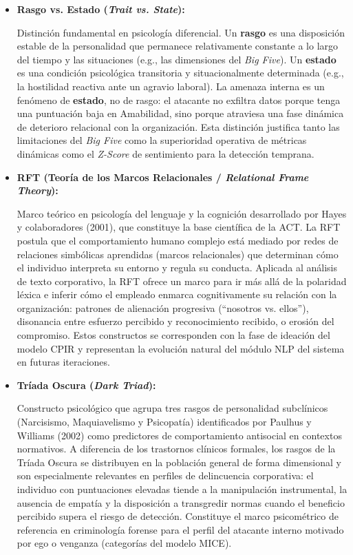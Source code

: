 \documentclass[IB]{TFUOC}%
\begin{document}
\begin{itemize}
    \item \textbf{Rasgo vs. Estado ({\textit{Trait vs. State}}):}
    
    Distinción fundamental en psicología diferencial. Un \textbf{rasgo} es una disposición estable de la personalidad que permanece relativamente constante a lo largo del tiempo 
    y las situaciones (e.g., las dimensiones del \textit{Big Five}). 
    Un \textbf{estado} es una condición psicológica transitoria y situacionalmente determinada (e.g., la hostilidad reactiva ante un agravio laboral). La amenaza interna es un fenómeno de \textbf{estado}, no de rasgo: el atacante no exfiltra datos porque tenga una puntuación baja en Amabilidad, sino porque atraviesa una fase dinámica de deterioro relacional con la organización. Esta distinción justifica tanto las limitaciones del \textit{Big Five} como la superioridad operativa de métricas dinámicas como el \textit{Z-Score} de sentimiento para la detección temprana.

    \item \textbf{RFT (Teoría de los Marcos Relacionales / 
    \textit{Relational Frame Theory}):}
    
    Marco teórico en psicología del lenguaje y la cognición desarrollado por Hayes y colaboradores (2001), que constituye la base científica de la ACT. La RFT postula que el comportamiento humano complejo está mediado por redes de 
    relaciones simbólicas aprendidas (marcos relacionales) que determinan cómo el individuo interpreta su entorno y regula su conducta. Aplicada al análisis de texto corporativo, la RFT ofrece un marco para ir más allá de la polaridad léxica e inferir cómo el empleado enmarca cognitivamente su relación con la organización: patrones de alienación progresiva (``nosotros vs. ellos''), disonancia entre esfuerzo percibido y reconocimiento recibido, o erosión del compromiso. Estos constructos se corresponden con la fase de ideación del modelo CPIR y representan la evolución natural del módulo NLP del sistema en futuras iteraciones.

    \item \textbf{Tríada Oscura (\textit{Dark Triad}):}
    
    Constructo psicológico que agrupa tres rasgos de personalidad subclínicos (Narcisismo, Maquiavelismo y Psicopatía) identificados por Paulhus y Williams (2002) como predictores de comportamiento antisocial en contextos normativos. A diferencia de los trastornos clínicos formales, los rasgos de la Tríada Oscura se distribuyen en la población general de forma dimensional y son especialmente relevantes en perfiles de delincuencia corporativa: el individuo con puntuaciones elevadas tiende a la manipulación instrumental, la ausencia de empatía y la disposición a transgredir normas cuando el beneficio percibido supera el riesgo de detección. 
    Constituye el marco psicométrico de referencia en criminología forense para el perfil del atacante interno motivado por ego o venganza (categorías del modelo MICE).


\end{itemize}
\end{document}
